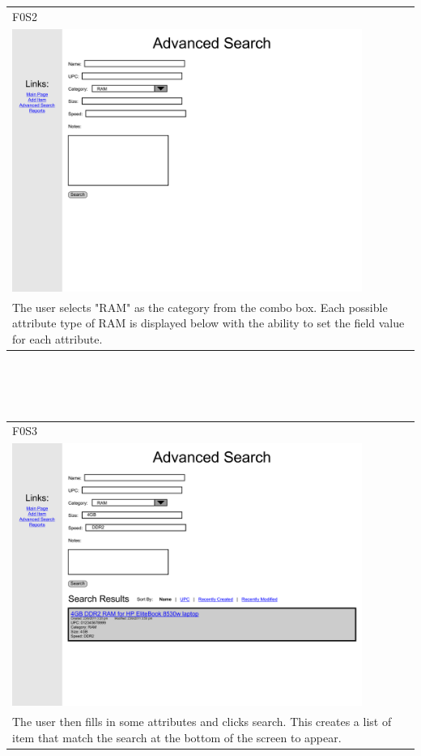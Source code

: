 \documentclass{article}
\begin{document}
~\\
~\\
\begin{tabular}{ p{4.5in} }
F0S2\\
\includegraphics[keepaspectratio, width=4.5in]{advancedSearchF0S2.pdf} \\
The user selects "RAM" as the category from the combo box. Each possible attribute type of RAM is displayed below with the ability to set the field value for each attribute.
\end{tabular}\\
~\\
~\\
\begin{tabular}{ p{4.5in} }
F0S3\\
\includegraphics[keepaspectratio, width=4.5in]{advancedSearchF0S3.pdf} \\
The user then fills in some attributes and clicks search.  This creates a list of item that match the search at the bottom of the screen to appear.
\end{tabular}\\
\end{document}
